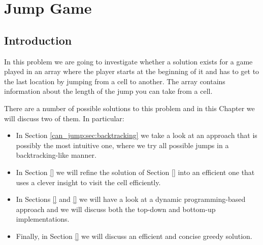 %

\chapter{Jump Game}
\label{ch:can_jump}
\section*{Introduction}
In this problem we are going to investigate whether a solution exists for a game played in an array
where the player starts at the beginning of it and has to get to the last location by jumping from a
cell to another. The array contains information about the length of the jump you can take from a
cell. 

There are a number of possible solutions to this problem and in this Chapter we will discuss two of
them. In particular:
\begin{itemize}
	\item In Section \ref{can_jump:sec:backtracking} we take a look at an approach that is possibly
	 the most intuitive one, where we try all possible jumps in a backtracking-like manner.
	\item In Section \ref{} we will refine the solution of Section \ref{} into an efficient one that
	uses a clever insight to visit the cell efficiently. 
	\item In Sections \ref{} and \ref{} we will have a look at a dynamic programming-based approach
	and we will discuss both the top-down and bottom-up implementations.
	\item Finally, in Section \ref{} we will discuss an efficient and concise greedy solution.
\end{itemize}


